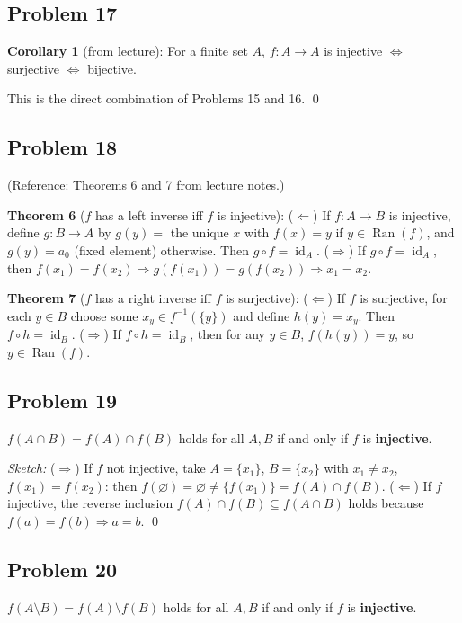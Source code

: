 \subsection*{Problem 17}
\textbf{Corollary 1} (from lecture): For a finite set $A$, $f:A\to A$ is injective $\Leftrightarrow$ surjective $\Leftrightarrow$ bijective.

This is the direct combination of Problems 15 and 16. \qed

\subsection*{Problem 18}
(Reference: Theorems 6 and 7 from lecture notes.)

\textbf{Theorem 6} ($f$ has a left inverse iff $f$ is injective): ($\Leftarrow$) If $f:A\to B$ is injective, define $g:B\to A$ by $g(y)=$ the unique $x$ with $f(x)=y$ if $y\in\operatorname{Ran}(f)$, and $g(y)=a_0$ (fixed element) otherwise. Then $g\circ f = \operatorname{id}_A$. ($\Rightarrow$) If $g\circ f=\operatorname{id}_A$, then $f(x_1)=f(x_2)\Rightarrow g(f(x_1))=g(f(x_2))\Rightarrow x_1=x_2$.

\textbf{Theorem 7} ($f$ has a right inverse iff $f$ is surjective): ($\Leftarrow$) If $f$ is surjective, for each $y\in B$ choose some $x_y\in f^{-1}(\{y\})$ and define $h(y)=x_y$. Then $f\circ h=\operatorname{id}_B$. ($\Rightarrow$) If $f\circ h=\operatorname{id}_B$, then for any $y\in B$, $f(h(y))=y$, so $y\in\operatorname{Ran}(f)$.

\subsection*{Problem 19}
$f(A\cap B)=f(A)\cap f(B)$ holds for all $A,B$ if and only if $f$ is \textbf{injective}.

\emph{Sketch:} ($\Rightarrow$) If $f$ not injective, take $A=\{x_1\}$, $B=\{x_2\}$ with $x_1\neq x_2$, $f(x_1)=f(x_2)$: then $f(\varnothing)=\varnothing\neq\{f(x_1)\}=f(A)\cap f(B)$. ($\Leftarrow$) If $f$ injective, the reverse inclusion $f(A)\cap f(B)\subseteq f(A\cap B)$ holds because $f(a)=f(b)\Rightarrow a=b$. \qed

\subsection*{Problem 20}
$f(A\setminus B)=f(A)\setminus f(B)$ holds for all $A,B$ if and only if $f$ is \textbf{injective}.

